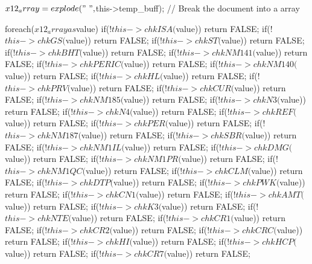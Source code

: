 \begin{DoxyCode}
                             {
                
                $x12_array = explode("~", $this->temp_buff); // Break the
       document into a array

                foreach($x12_array as $value){
                        if(!$this->chkISA($value)){ return FALSE; }
                        if(!$this->chkGS($value)){ return FALSE; }
                        if(!$this->chkST($value)){ return FALSE; }
                        if(!$this->chkBHT($value)){ return FALSE; }
                        if(!$this->chkNM141($value)){ return FALSE; }
                        if(!$this->chkPERIC($value)){ return FALSE; }
                        if(!$this->chkNM140($value)){ return FALSE; }
                        if(!$this->chkHL($value)){ return FALSE; }
                        if(!$this->chkPRV($value)){ return FALSE; }
                        if(!$this->chkCUR($value)){ return FALSE; }
                        if(!$this->chkNM185($value)){ return FALSE; }
                        if(!$this->chkN3($value)){ return FALSE; }
                        if(!$this->chkN4($value)){ return FALSE; }
                        if(!$this->chkREF($value)){ return FALSE; }
                        if(!$this->chkPER($value)){ return FALSE; }
                        if(!$this->chkNM187($value)){ return FALSE; }
                        if(!$this->chkSBR($value)){ return FALSE; }
                        if(!$this->chkNM1IL($value)){ return FALSE; }
                        if(!$this->chkDMG($value)){ return FALSE; }
                        if(!$this->chkNM1PR($value)){ return FALSE; }
                        if(!$this->chkNM1QC($value)){ return FALSE; }
                        if(!$this->chkCLM($value)){ return FALSE; }
                        if(!$this->chkDTP($value)){ return FALSE; }
                        if(!$this->chkPWK($value)){ return FALSE; }
                        if(!$this->chkCN1($value)){ return FALSE; }
                        if(!$this->chkAMT($value)){ return FALSE; }
                        if(!$this->chkK3($value)){ return FALSE; }
                        if(!$this->chkNTE($value)){ return FALSE; }
                        if(!$this->chkCR1($value)){ return FALSE; }
                        if(!$this->chkCR2($value)){ return FALSE; }
                        if(!$this->chkCRC($value)){ return FALSE; }
                        if(!$this->chkHI($value)){ return FALSE; }
                        if(!$this->chkHCP($value)){ return FALSE; }
                        if(!$this->chkCR7($value)){ return FALSE; }
}}
\end{DoxyCode}
